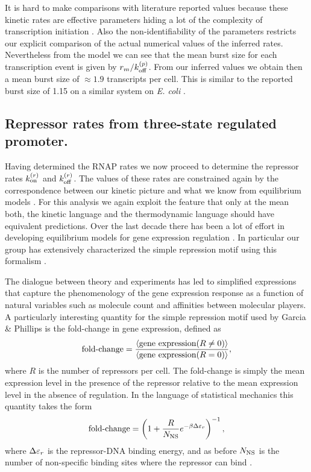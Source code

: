 It is hard to make comparisons with literature reported values because these
kinetic rates are effective parameters hiding a lot of the complexity of
transcription initiation \cite{Browning2004}. Also the non-identifiability of
the parameters restricts our explicit comparison of the actual numerical values
of the inferred rates. Nevertheless from the model we can see that the mean
burst  size for each transcription event is given by $r_m / k^{(p)}_{\text{off}}$. From our
inferred values we obtain then a mean burst size of $\approx 1.9$ transcripts
per cell. This is similar to the reported burst size of 1.15 on a similar system
on \textit{E. coli} \cite{Yu2006}.

\subsection{Repressor rates from three-state regulated promoter.}

Having determined the RNAP rates we now proceed to determine the repressor rates
$k^{(r)}_{\text{on}}$ and $k^{(r)}_{\text{off}}$. The values of these rates are constrained again by the
correspondence between our kinetic picture and what we know from equilibrium
models \cite{Phillips2015}. For this analysis we again exploit the feature that
only at the mean both, the kinetic language and the thermodynamic language
should have equivalent predictions. Over the last decade there has been a lot of
effort in developing equilibrium models for gene expression regulation
\cite{Buchler2003, Vilar2011, Bintu2005a}. In particular our group has
extensively characterized the simple repression motif using this formalism
\cite{Garcia2011c, Brewster2014, Razo-Mejia2018}.

The dialogue between theory and experiments has led to simplified expressions
that capture the phenomenology of the gene expression response as a function of
natural variables such as molecule count and affinities between molecular
players. A particularly interesting quantity for the simple repression motif
used by Garcia \& Phillips \cite{Garcia2011c} is the fold-change in gene
expression, defined as
\begin{equation}
  \text{fold-change} = {\left\langle \text{gene expression}(R \neq 0) \right\rangle \over
                 \left\langle \text{gene expression}(R = 0) \right\rangle},
\end{equation}
where $R$ is the number of repressors per cell. The fold-change is simply the
mean expression level in the presence of the repressor relative to the mean
expression level in the absence of regulation. In the language of statistical
mechanics this quantity takes the form
\begin{equation}
  \text{fold-change} = \left( 1 + {R \over N_\text{NS}} e^{-\beta\Delta\varepsilon_r} \right)^{-1},
  \label{seq_fc_thermo}
\end{equation}
where $\Delta\varepsilon_r$ is the repressor-DNA binding energy, and as before $N_\text{NS}$ is the
number of non-specific binding sites where the repressor can bind
\cite{Garcia2011c}.

